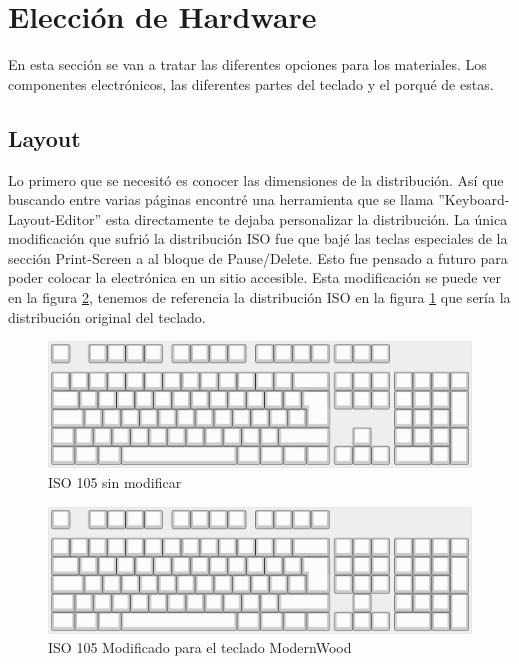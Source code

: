 \section{Elección de Hardware} \label{DiseñoHardware}
En esta sección se van a tratar las diferentes opciones para los materiales. Los componentes electrónicos, las diferentes partes del teclado y el porqué de estas.

\subsection{Layout} \label{DiseñoLayaout}
Lo primero que se necesitó es conocer las dimensiones de la distribución. Así que buscando entre varias páginas encontré una herramienta que se llama ''Keyboard-Layout-Editor'' \cite{Layout-Editor} esta directamente te dejaba personalizar la distribución. La única modificación que sufrió la distribución \gls{ISO} fue que bajé las teclas especiales de la sección Print-Screen a al bloque de Pause/Delete. Esto fue pensado a futuro para poder colocar la electrónica en un sitio accesible. Esta modificación se puede ver en la figura \ref{fig:eISo_layout_modificado}, tenemos de referencia la distribución \gls{ISO} en la figura \ref{fig:ISO_layout} que sería la distribución original del teclado.

\begin{figure}[H] %
    \centering
    \includegraphics[width=1\textwidth]{imagenes/Capitulos/Cap03/ISO105Layout.png}
    \caption{\gls{ISO} 105 sin modificar}
    \label{fig:ISO_layout}
\end{figure}

\begin{figure}[H] %
    \centering
    \includegraphics[width=1\textwidth]{imagenes/Capitulos/Cap03/ModernWoodLayout.png}
    \caption{\gls{ISO} 105 Modificado para el teclado ModernWood}
    \label{fig:eISo_layout_modificado}
\end{figure}

